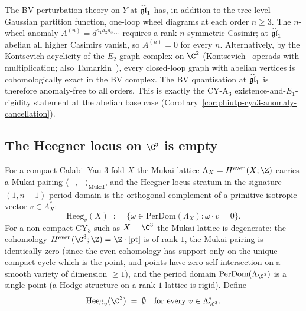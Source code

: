 \begin{remark}
\label{rem:bl-bv-higher-wheel}
The BV perturbation theory on $Y$ at $\widehat{\mathfrak{gl}}_1$ has, in addition to the
tree-level Gaussian partition function, one-loop wheel diagrams at
each order $n \geq 3$. The $n$-wheel anomaly
$A^{(n)} = d^{a_1 a_2 a_3}\cdots$ requires a rank-$n$ symmetric
Casimir; at $\widehat{\mathfrak{gl}}_1$ abelian all higher Casimirs vanish, so
$A^{(n)} = 0$ for every $n$. Alternatively, by the Kontsevich
acyclicity of the $E_2$-graph complex on $\C^2$
(Kontsevich~\cite{Kontsevich1999} operads with multiplication; also
Tamarkin~\cite{Tamarkin2003}), every closed-loop graph with abelian
vertices is cohomologically exact in the BV complex. The BV
quantisation at $\widehat{\mathfrak{gl}}_1$ is therefore anomaly-free to all orders.
This is exactly the CY-A$_3$ existence-and-$E_1$-rigidity statement
at the abelian base case
(Corollary~\ref{cor:phiutp-cya3-anomaly-cancellation}).
\end{remark}

\subsection*{The Heegner locus on $\C^3$ is empty}

\begin{definition}[Heegner locus of the Mukai lattice at $X = \C^3$]
\label{def:bl-bv-c3-heegner-locus}
\ClaimStatusDefinitional
For a compact Calabi--Yau $3$-fold $X$ the Mukai lattice
$\Lambda_X = H^{\mathrm{even}}(X;\Z)$ carries a Mukai pairing
$\langle-,-\rangle_\mathrm{Mukai}$, and the Heegner-locus stratum in
the signature-$(1, n-1)$ period domain is the orthogonal complement
of a primitive isotropic vector $v\in\Lambda_X^*$:
\[
  \mathrm{Heeg}_v(X) \;:=\;
  \{\omega\in\mathrm{PerDom}(\Lambda_X) : \omega\cdot v = 0\}.
\]
For a non-compact CY$_3$ such as $X = \C^3$ the Mukai lattice is
degenerate: the cohomology $H^{\mathrm{even}}(\C^3;\Z) = \Z\cdot[\mathrm{pt}]$
is of rank $1$, the Mukai pairing is identically zero (since the
even cohomology has support only on the unique compact cycle which
is the point, and points have zero self-intersection on a smooth
variety of dimension $\geq 1$), and the period domain
$\mathrm{PerDom}(\Lambda_{\C^3})$ is a single point (a Hodge structure
on a rank-$1$ lattice is rigid).
Define
\[
  \mathrm{Heeg}_v(\C^3) \;=\; \emptyset \quad\text{for every $v\in\Lambda^*_{\C^3}$.}
\]
\end{definition}

